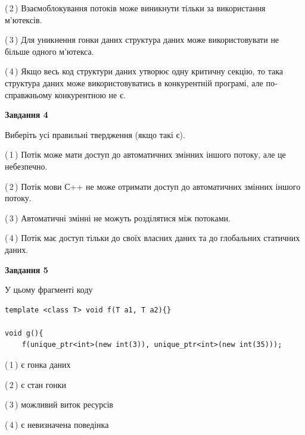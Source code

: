 \documentclass[12pt, ukrainian]{article}
\begin{document}
\begin {large}
{(\,2\,) Взаємоблокування потоків може виникнути тільки за використання м’ютексів.%

(\,3\,) Для уникнення гонки даних структура даних може використовувати не більше одного м’ютекса.%

(\,4\,) Якщо весь код структури даних утворює одну критичну секцію, то така структура даних може використовуватись в конкурентній програмі, але по-справжньо\-му конкурентною не є.%



\begin{center}
\textbf{Завдання 4}
\end{center}
Виберіть усі правильні твердження (якщо такі є).\par
\vspace{2mm}

(\,1\,) Потік може мати доступ до автоматичних змінних іншого потоку, але це небезпечно.%

(\,2\,) Потік мови С++ не може отримати доступ до автоматичних змінних іншого потоку.%

(\,3\,) Автоматичні змінні не можуть розділятися між потоками.%

(\,4\,) Потік має доступ тільки до своїх власних даних та до глобальних статичних даних.%



\begin{center}
\textbf{Завдання 5}
\end{center}
У цьому фрагменті коду
\begin{verbatim}
template <class T> void f(T a1, T a2){}

void g(){
    f(unique_ptr<int>(new int(3)), unique_ptr<int>(new int(35)));
\end{verbatim}

(\,1\,) є гонка даних%

(\,2\,) є стан гонки%

(\,3\,) можливий виток ресурсів%

(\,4\,) є невизначена поведінка%


}
\end {large}
\end{document}
